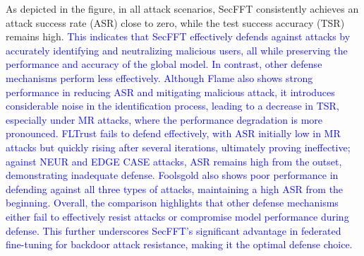 \documentclass[a4paper,twoside,11pt,dvipsnames]{reviewresponse}
\begin{document}
As depicted in the figure, in all attack scenarios, SecFFT consistently achieves an attack success rate (ASR) close to zero, while the test success accuracy (TSR) remains high. \textcolor{blue}{This indicates that SecFFT effectively defends against attacks by accurately identifying and neutralizing malicious users, all while preserving the performance and accuracy of the global model. In contrast, other defense mechanisms perform less effectively. Although Flame also shows strong performance in reducing ASR and mitigating malicious attack, it introduces considerable noise in the identification process, leading to a decrease in TSR, especially under MR attacks, where the performance degradation is more pronounced. FLTrust fails to defend effectively, with ASR initially low in MR attacks but quickly rising after several iterations, ultimately proving ineffective; against NEUR and EDGE CASE attacks, ASR remains high from the outset, demonstrating inadequate defense. Foolsgold also shows poor performance in defending against all three types of attacks, maintaining a high ASR from the beginning. Overall, the comparison highlights that other defense mechanisms either fail to effectively resist attacks or compromise model performance during defense. This further underscores SecFFT's significant advantage in federated fine-tuning for backdoor attack resistance, making it the optimal defense choice.}









\end{document}
